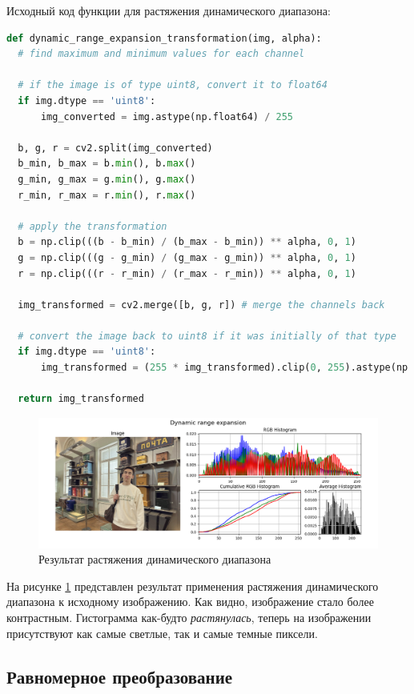 Исходный код функции для растяжения динамического диапазона:

\begin{lstlisting}[language=Python]
def dynamic_range_expansion_transformation(img, alpha):
  # find maximum and minimum values for each channel

  # if the image is of type uint8, convert it to float64
  if img.dtype == 'uint8':
      img_converted = img.astype(np.float64) / 255

  b, g, r = cv2.split(img_converted)
  b_min, b_max = b.min(), b.max()
  g_min, g_max = g.min(), g.max()
  r_min, r_max = r.min(), r.max()

  # apply the transformation
  b = np.clip(((b - b_min) / (b_max - b_min)) ** alpha, 0, 1)
  g = np.clip(((g - g_min) / (g_max - g_min)) ** alpha, 0, 1)
  r = np.clip(((r - r_min) / (r_max - r_min)) ** alpha, 0, 1)

  img_transformed = cv2.merge([b, g, r]) # merge the channels back

  # convert the image back to uint8 if it was initially of that type
  if img.dtype == 'uint8':
      img_transformed = (255 * img_transformed).clip(0, 255).astype(np.uint8)

  return img_transformed
\end{lstlisting}

\begin{figure}[H]
    \centering
    \includegraphics[width=\textwidth]{../results/Dynamic range expansion.png}
    \caption{Результат растяжения динамического диапазона}
    \label{fig:dynamic}
\end{figure}

На рисунке \ref{fig:dynamic} представлен результат применения растяжения динамического диапазона к исходному изображению. Как видно, изображение стало более контрастным. 
Гистограмма как-будто \textit{растянулась}, теперь на изображении присутствуют как самые светлые, так и самые темные пиксели. 

\subsection{Равномерное преобразование}

